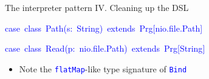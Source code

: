 \documentclass[english,,russian]{beamer}
\newenvironment{lyxcode}
  {\par\begin{list}{}{
    \setlength{\rightmargin}{\leftmargin}
    \setlength{\listparindent}{0pt}%
    \raggedright
    \setlength{\itemsep}{0pt}
    \setlength{\parsep}{0pt}
    \normalfont\ttfamily}%
   \def\{{\char`\{}
   \def\}{\char`\}}
   \def\textasciitilde{\char`\~}
   \item[]}
  {\end{list}}
\begin{document}
\begin{frame}{The interpreter pattern IV. Cleaning up the DSL}
\begin{lyxcode}
\textcolor{blue}{\footnotesize{}case~class~Path(s:~String)~extends~Prg{[}nio.file.Path{]}}{\footnotesize\par}

\textcolor{blue}{\footnotesize{}case~class~Read(p:~nio.file.Path)~extends~Prg{[}String{]}}{\footnotesize\par}
\end{lyxcode}
\begin{itemize}
\item \vspace{-0.15cm}Note the \texttt{\textcolor{blue}{\footnotesize{}flatMap}}-like
type signature of \texttt{\textcolor{blue}{\footnotesize{}Bind}} 
\end{itemize}
\begin{lyxcode}
\end{lyxcode}
\end{frame}
\end{document}
